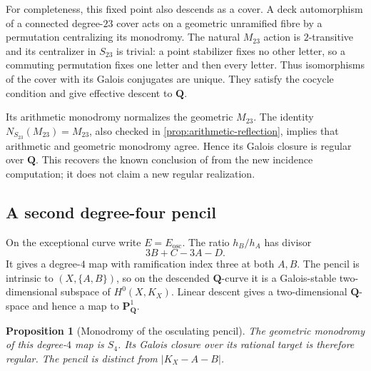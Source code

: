 \documentclass[11pt]{amsart}
\newtheorem{proposition}[proposition]{Proposition}
\theoremstyle{definition}
\theoremstyle{remark}
\newcommand{\QQ}{\mathbf Q}
\newcommand{\PP}{\mathbf P}
\begin{document}
For completeness, this fixed point also descends as a cover.
A deck automorphism of a connected degree-$23$ cover acts on a
geometric unramified fibre by a permutation centralizing its
monodromy.  The natural $M_{23}$ action is $2$-transitive and its
centralizer in $S_{23}$ is trivial: a point stabilizer fixes no
other letter, so a commuting permutation fixes one letter and
then every letter.
Thus isomorphisms of the cover with its Galois conjugates are
unique.  They satisfy the cocycle condition and give effective
descent to $\QQ$.

Its arithmetic monodromy normalizes the geometric $M_{23}$.
The identity $N_{S_{23}}(M_{23})=M_{23}$, also checked in
\cref{prop:arithmetic-reflection}, implies that arithmetic and
geometric monodromy agree.  Hence its Galois closure is regular
over $\QQ$.  This recovers the known conclusion of \cite{HJLPPZ}
from the new incidence computation; it does not claim a new
regular realization.

\subsection{A second degree-four pencil}

On the exceptional curve write $E=E_{\mathrm{osc}}$.
The ratio $h_B/h_A$ has divisor
\[
 3B+C-3A-D.
\]
It gives a degree-$4$ map with ramification index three at both $A,B$.
The pencil is intrinsic to $(X,\{A,B\})$, so on the descended
$\QQ$-curve it is a Galois-stable two-dimensional subspace of
$H^0(X,K_X)$.  Linear descent gives a two-dimensional
$\QQ$-space and hence a map to $\PP^1_{\QQ}$.

\begin{proposition}[Monodromy of the osculating pencil]
\label{prop:osculating-s4}
The geometric monodromy of this degree-$4$ map is $S_4$.
Its Galois closure over its rational target is therefore regular.
The pencil is distinct from $|K_X-A-B|$.
\end{proposition}
\end{document}
